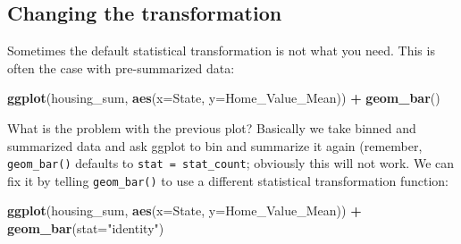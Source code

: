 \documentclass[]{book}
\newenvironment{Shaded}{\begin{snugshade}}{\end{snugshade}}
\newcommand{\KeywordTok}[1]{\textcolor[rgb]{0.13,0.29,0.53}{\textbf{#1}}}
\newcommand{\DataTypeTok}[1]{\textcolor[rgb]{0.13,0.29,0.53}{#1}}
\newcommand{\StringTok}[1]{\textcolor[rgb]{0.31,0.60,0.02}{#1}}
\newcommand{\OperatorTok}[1]{\textcolor[rgb]{0.81,0.36,0.00}{\textbf{#1}}}
\newcommand{\NormalTok}[1]{#1}
\begin{document}
\subsection{Changing the
transformation}\label{changing-the-transformation}

Sometimes the default statistical transformation is not what you need.
This is often the case with pre-summarized data:

\begin{Shaded}
\end{Shaded}

\begin{Shaded}
\begin{Highlighting}[]
\KeywordTok{ggplot}\NormalTok{(housing_sum, }\KeywordTok{aes}\NormalTok{(}\DataTypeTok{x=}\NormalTok{State, }\DataTypeTok{y=}\NormalTok{Home_Value_Mean)) }\OperatorTok{+}\StringTok{ }
\StringTok{  }\KeywordTok{geom_bar}\NormalTok{()}
\end{Highlighting}
\end{Shaded}

What is the problem with the previous plot? Basically we take binned and
summarized data and ask ggplot to bin and summarize it again (remember,
\texttt{geom\_bar()} defaults to \texttt{stat\ =\ stat\_count};
obviously this will not work. We can fix it by telling
\texttt{geom\_bar()} to use a different statistical transformation
function:

\begin{Shaded}
\begin{Highlighting}[]
\KeywordTok{ggplot}\NormalTok{(housing_sum, }\KeywordTok{aes}\NormalTok{(}\DataTypeTok{x=}\NormalTok{State, }\DataTypeTok{y=}\NormalTok{Home_Value_Mean)) }\OperatorTok{+}\StringTok{ }
\StringTok{  }\KeywordTok{geom_bar}\NormalTok{(}\DataTypeTok{stat=}\StringTok{"identity"}\NormalTok{)}
\end{Highlighting}
\end{Shaded}
\end{document}
